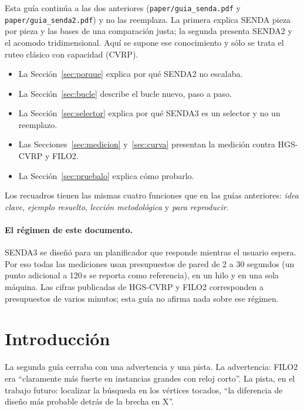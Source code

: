 \documentclass[11pt,a4paper]{article}
\newcommand{\senda}{SENDA}
\newcommand{\sendados}{SENDA2}
\newcommand{\sendatres}{SENDA3}
\newcommand{\tsl}[1]{\texttt{\small #1}}
\begin{document}
Esta guía continúa a las dos anteriores (\tsl{paper/guia\_senda.pdf} y \tsl{paper/guia\_senda2.pdf}) y
no las reemplaza. La primera explica \senda{} pieza por pieza y las bases de una comparación justa; la
segunda presenta \sendados{} y el acomodo tridimensional. Aquí se supone ese conocimiento y sólo se
trata el ruteo clásico con capacidad (CVRP).

\begin{itemize}[leftmargin=1.5em]
\item La Sección~\ref{sec:porque} explica por qué \sendados{} no escalaba.
\item La Sección~\ref{sec:bucle} describe el bucle nuevo, paso a paso.
\item La Sección~\ref{sec:selector} explica por qué \sendatres{} es un selector y no un reemplazo.
\item Las Secciones~\ref{sec:medicion} y~\ref{sec:curva} presentan la medición contra HGS-CVRP y FILO2.
\item La Sección~\ref{sec:pruebalo} explica cómo probarlo.
\end{itemize}

Los recuadros tienen las mismas cuatro funciones que en las guías anteriores: \emph{idea clave},
\emph{ejemplo resuelto}, \emph{lección metodológica} y \emph{para reproducir}.

\paragraph{El régimen de este documento.} \sendatres{} se diseñó para un planificador que responde
mientras el usuario espera. Por eso todas las mediciones usan presupuestos de pared de 2 a 30 segundos
(un punto adicional a 120\,s se reporta como referencia), en un hilo y en una sola máquina. Las cifras
publicadas de HGS-CVRP y FILO2 corresponden a presupuestos de varios minutos; esta guía no afirma nada
sobre ese régimen.

\section{Introducción}
\label{sec:intro}

La segunda guía cerraba con una advertencia y una pista. La advertencia: FILO2 era ``claramente más
fuerte en instancias grandes con reloj corto''. La pista, en el trabajo futuro: localizar la búsqueda
en los vértices tocados, ``la diferencia de diseño más probable detrás de la brecha en X''.
\end{document}
